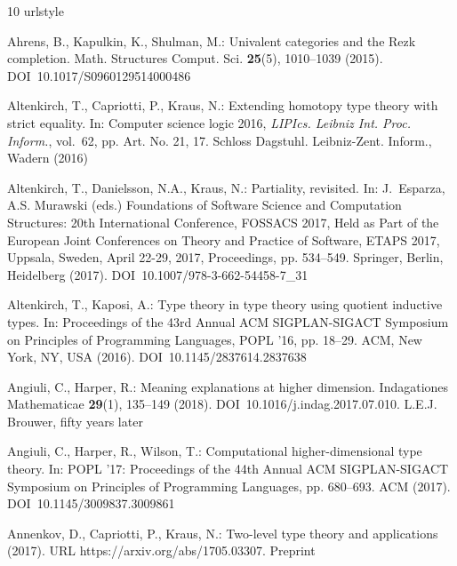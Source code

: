 \documentclass[12pt]{article}
\begin{document}
\begin{thebibliography}{10}
\providecommand{\url}[1]{{#1}}
\providecommand{\urlprefix}{URL }
\expandafter\ifx\csname urlstyle\endcsname\relax
  \providecommand{\doi}[1]{DOI~\discretionary{}{}{}#1}\else
  \providecommand{\doi}{DOI~\discretionary{}{}{}\begingroup
  \urlstyle{rm}\Url}\fi

Ahrens, B., Kapulkin, K., Shulman, M.: Univalent categories and the {R}ezk
  completion.
\newblock Math. Structures Comput. Sci. \textbf{25}(5), 1010--1039 (2015).
\newblock \doi{10.1017/S0960129514000486}

Altenkirch, T., Capriotti, P., Kraus, N.: Extending homotopy type theory with
  strict equality.
\newblock In: Computer science logic 2016, \emph{LIPIcs. Leibniz Int. Proc.
  Inform.}, vol.~62, pp. Art. No. 21, 17. Schloss Dagstuhl. Leibniz-Zent.
  Inform., Wadern (2016)

Altenkirch, T., Danielsson, N.A., Kraus, N.: Partiality, revisited.
\newblock In: J.~Esparza, A.S. Murawski (eds.) Foundations of Software Science
  and Computation Structures: 20th International Conference, FOSSACS 2017, Held
  as Part of the European Joint Conferences on Theory and Practice of Software,
  ETAPS 2017, Uppsala, Sweden, April 22-29, 2017, Proceedings, pp. 534--549.
  Springer, Berlin, Heidelberg (2017).
\newblock \doi{10.1007/978-3-662-54458-7_31}

Altenkirch, T., Kaposi, A.: Type theory in type theory using quotient inductive
  types.
\newblock In: Proceedings of the 43rd Annual ACM SIGPLAN-SIGACT Symposium on
  Principles of Programming Languages, POPL '16, pp. 18--29. ACM, New York, NY,
  USA (2016).
\newblock \doi{10.1145/2837614.2837638}

Angiuli, C., Harper, R.: Meaning explanations at higher dimension.
\newblock Indagationes Mathematicae \textbf{29}(1), 135--149 (2018).
\newblock \doi{10.1016/j.indag.2017.07.010}.
\newblock L.E.J. Brouwer, fifty years later

Angiuli, C., Harper, R., Wilson, T.: Computational higher-dimensional type
  theory.
\newblock In: POPL '17: Proceedings of the 44th Annual ACM SIGPLAN-SIGACT
  Symposium on Principles of Programming Languages, pp. 680--693. ACM (2017).
\newblock \doi{10.1145/3009837.3009861}

Annenkov, D., Capriotti, P., Kraus, N.: Two-level type theory and applications
  (2017).
\newblock \urlprefix\url{https://arxiv.org/abs/1705.03307}.
\newblock Preprint


\end{thebibliography}
\end{document}
